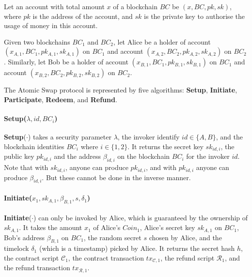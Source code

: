 Let an account with total amount $x$ of a blockchain $BC$ be
$(x,BC,pk,sk)$, where $pk$ is the address of the account, and $sk$ is
the private key to authorise the usage of money in this account.

Given two blockchains $BC_1$ and $BC_2$, let Alice be a holder of
account $(x_{A,1},BC_1,pk_{A,1},sk_{A,1})$ on $BC_1$ and account
$(x_{A,2},BC_2,pk_{A,2},sk_{A,2})$ on $BC_2$. Similarly, let Bob be a
holder of account $(x_{B,1},BC_1,pk_{B,1},sk_{B,1})$ on $BC_1$ and
account $(x_{B,2},BC_2,pk_{B,2},sk_{B,2})$ on $BC_2$.

The Atomic Swap protocol is represented by five algorithms:
\textbf{Setup},
\textbf{Initiate},
\textbf{Participate},
\textbf{Redeem}, and
\textbf{Refund}.


\paragraph{\textbf{Setup}($\lambda, id, BC_i$)}
\textbf{Setup}($\cdot$) takes a security parameter $\lambda$,
the invoker identify $id \in \{A, B\}$,
and the blockchain identities $BC_i$ where $i \in \{1, 2\}$.
It returns the secret key $sk_{id, i}$, the public key $pk_{id, i}$ and the address $\beta_{id, i}$ on the blockchain $BC_i$ for the invoker $id$.
Note that with $sk_{id, i}$, anyone can produce $pk_{id, i}$, and with $pk_{id, i}$ anyone can produce $\beta_{id, i}$. But these cannot be done in the inverse manner.

\paragraph{\textbf{Initiate}($x_1, sk_{A, 1}, \beta_{B, 1}, s, \delta_1$)}
\textbf{Initiate}($\cdot$) can only be invoked by Alice, which is guaranteed by the ownership of $sk_{A, 1}$.
It takes the amount $x_1$ of Alice's $Coin_1$,
Alice's secret key $sk_{A, 1}$ on $BC_1$,
Bob's address $\beta_{B, 1}$ on $BC_1$,
the random secret $s$ chosen by Alice,
and the timelock $\delta_1$ (which is a timestamp) picked by Alice.
It returns the secret hash $h$,
the contract script $\mathcal{C}_1$,
the contract transaction $tx_{\mathcal{C}, 1}$,
the refund script $\mathcal{R}_1$,
and the refund transaction $tx_{\mathcal{R}, 1}$.


